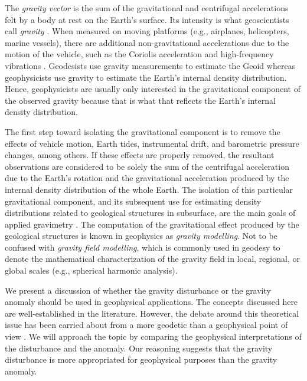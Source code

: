 \documentclass[extra]{gji}
\begin{document}
The \textit{gravity vector} is the sum of the gravitational and centrifugal
accelerations felt by a body at rest on the Earth's surface.
Its intensity is what geoscientists call \textit{gravity}
\citep{heiskanen-moritz1967, hofmann-wellenhof-moritz2005}.
When measured on moving platforms (e.g., airplanes,
helicopters, marine vessels), there are additional
non-gravitational accelerations due to the motion of the vehicle,
such as the Coriolis acceleration and high-frequency vibrations
\citep{glennie-etal2000,nabighian-etal2005-grav,baumann-etal2012}.
Geodesists use gravity measurements to estimate the Geoid \citep{li2001}
whereas geophysicists use gravity to estimate the Earth's
internal density distribution.
Hence, geophysicists are usually only interested
in the gravitational component of the observed gravity
because that is what that reflects the Earth's internal density distribution.

The first step toward isolating the gravitational component
is to remove the effects of vehicle motion, Earth tides, instrumental drift,
and barometric pressure changes, among others.
If these effects are properly removed,
the resultant observations are considered to be solely
the sum of the centrifugal acceleration due to the Earth's rotation and
the gravitational acceleration produced by
the internal density distribution of the whole Earth.
The isolation of this particular gravitational component,
and its subsequent use for estimating density
distributions related to geological structures in subsurface,
are the main goals of applied gravimetry \citep{blakely1996}.
The computation of the gravitational effect produced by
the geological structures is known in geophysics as
\textit{gravity modelling}.
Not to be confused with \textit{gravity field modelling}, which
is commonly used in geodesy to denote the mathematical characterization of the
gravity field in local, regional, or global scales (e.g., spherical harmonic
analysis).

We present a discussion of whether the gravity disturbance or the gravity
anomaly should be used in geophysical applications.
The concepts discussed here are well-established in the literature.
However, the debate around this theoretical issue has been
carried about from a more geodetic than a geophysical point of view
\citep{lafehr1991,chapin1996,li2001,fairhead2003,
hackney-featherstone2003,hinze2005}.
We will approach the topic by comparing the geophysical interpretations of the
disturbance and the anomaly.
Our reasoning suggests that the gravity disturbance is more appropriated for
geophysical purposes than the gravity anomaly.
\end{document}
